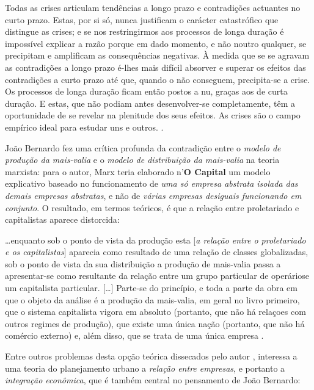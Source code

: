 \begin{citacao}
Todas as crises articulam tendências a longo prazo e contradições actuantes no curto prazo. Estas, por si só, nunca justificam o carácter catastrófico que distingue as crises; e se nos restringirmos aos processos de longa duração é impossível explicar a razão porque em dado momento, e não noutro qualquer, se precipitam e amplificam as consequências negativas. À medida que se se agravam as contradições a longo prazo é-lhes mais difícil absorver e superar os efeitos das contradições a curto prazo até que, quando o não conseguem, precipita-se a crise. Os processos de longa duração ficam então postos a nu, graças aos de curta duração. E estas, que não podiam antes desenvolver-se completamente, têm a oportunidade de se revelar na plenitude dos seus efeitos. As crises são o campo empírico ideal para estudar uns e outros. \cite[p.~128]{BERNARDO1997}.
\end{citacao}

João Bernardo fez uma crítica profunda da contradição entre o \textit{modelo de produção da mais-valia} e o \textit{modelo de distribuição da mais-valia} na teoria marxista: para o autor, Marx teria elaborado n'\textbf{O Capital} um modelo explicativo baseado no funcionamento de \textit{uma só empresa abstrata isolada das demais empresas abstratas}, e não de \textit{várias empresas desiguais funcionando em conjunto}. O resultado, em termos teóricos, é que a relação entre proletariado e capitalistas aparece distorcida: 

\begin{citacao}
\dots enquanto sob o ponto de vista da produção esta [\textit{a relação entre o proletariado e os capitalistas}] aparecia como resultado de uma relação de classes globalizadas, sob o ponto de vista da sua distribuição a produção de mais-valia passa a apresentar-se como resultante da relação entre um grupo particular de operáriose um capitalista particular. [\dots] Parte-se do princípio, e toda a parte da obra em que o objeto da análise é a produção da mais-valia, em geral no livro primeiro, que o sistema capitalista vigora em absoluto (portanto, que não há relaçoes com outros regimes de produção), que existe uma única nação (portanto, que não há comércio externo) e, além disso, que se trata de uma única empresa \cite[p.~10-11]{BERNARDO1977b}.
\end{citacao}

Entre outros problemas desta opção teórica dissecados pelo autor \cite[p.~7-21]{BERNARDO1977b}, interessa a uma teoria do planejamento urbano a \textit{relação entre empresas}, e portanto a \textit{integração econômica}, que é também central no pensamento de João Bernardo:

